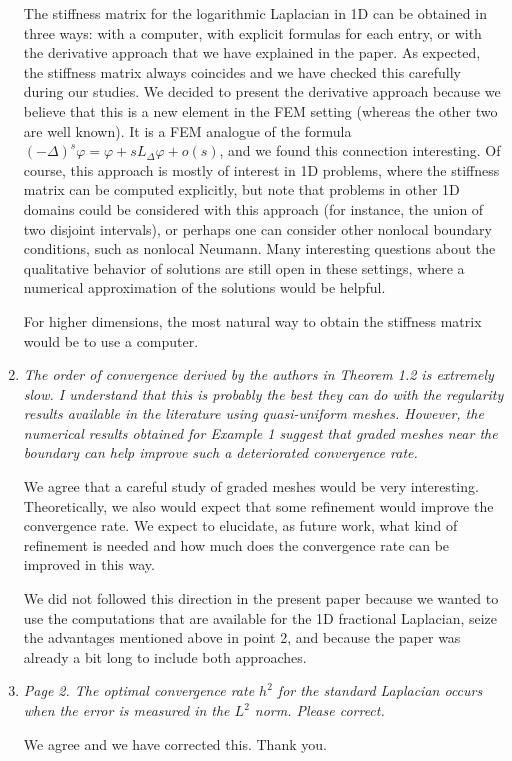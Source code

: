 \documentclass[11 pt]{article}
\numberwithin{equation}{section}
\begin{document}
\begin{enumerate}
The stiffness matrix for the logarithmic Laplacian in 1D can be obtained in three ways: with a computer, with explicit formulas for each entry, or with the derivative approach that we have explained in the paper. As expected, the stiffness matrix always coincides and we have checked this carefully during our studies. We decided to present the derivative approach because we believe that this is a new element in the FEM setting (whereas the other two are well known). It is a FEM analogue of the formula
$(-\Delta)^s\varphi = \varphi + sL_\Delta \varphi + o(s)$, and we found this connection interesting.  Of course, this approach is mostly of interest in 1D problems, where the stiffness matrix can be computed explicitly, but note that problems in other 1D domains could be considered with this approach (for instance, the union of two disjoint intervals), or perhaps one can consider other nonlocal boundary conditions, such as nonlocal Neumann.  Many interesting questions about the qualitative behavior of solutions are still open in these settings, where a numerical approximation of the solutions would be helpful.

For higher dimensions, the most natural way to obtain the stiffness matrix would be to use a computer.

\item \emph{
 The order of convergence derived by the authors in Theorem 1.2 is extremely slow. I understand that this is probably the best they can do with the regularity results available in the literature using quasi-uniform meshes. However, the numerical results obtained for Example 1 suggest that graded meshes near the boundary can help improve such a deteriorated convergence rate.
}

We agree that a careful study of graded meshes would be very interesting. Theoretically, we also would expect that some refinement would improve the convergence rate.  We expect to elucidate, as future work, what kind of refinement is needed and how much does the convergence rate can be improved in this way.

We did not followed this direction in the present paper because we wanted to use the computations that are available for the 1D fractional Laplacian, seize the advantages mentioned above in point 2, and because the paper was already a bit long to include both approaches.

\item
\emph{Page 2. The optimal convergence rate $h^2$ for the standard Laplacian occurs when the error is measured in the $L^2$ norm. Please correct.
}

We agree and we have corrected this. Thank you.
\end{enumerate}
\end{document}
